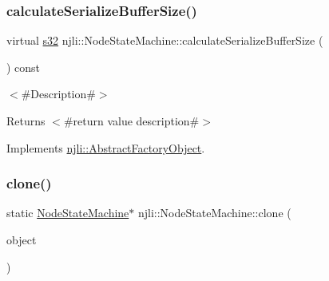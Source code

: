 \mbox{\label{classnjli_1_1_node_state_machine_a623987a0f43198b70aa9373d758a5afe}} 
\subsubsection{\texorpdfstring{calculate\+Serialize\+Buffer\+Size()}{calculateSerializeBufferSize()}}
{\footnotesize\ttfamily virtual \mbox{\hyperlink{_util_8h_aa62c75d314a0d1f37f79c4b73b2292e2}{s32}} njli\+::\+Node\+State\+Machine\+::calculate\+Serialize\+Buffer\+Size (\begin{DoxyParamCaption}{ }\end{DoxyParamCaption}) const\hspace{0.3cm}{\ttfamily [virtual]}}

$<$\#\+Description\#$>$

\begin{DoxyReturn}{Returns}
$<$\#return value description\#$>$ 
\end{DoxyReturn}


Implements \mbox{\hyperlink{classnjli_1_1_abstract_factory_object_a4763d05bc9dc37c559111f8bb30e1dd8}{njli\+::\+Abstract\+Factory\+Object}}.

\mbox{\label{classnjli_1_1_node_state_machine_a5fd34376d9ddab87af68c8e02b43e540}} 
\subsubsection{\texorpdfstring{clone()}{clone()}}
{\footnotesize\ttfamily static \mbox{\hyperlink{classnjli_1_1_node_state_machine}{Node\+State\+Machine}}$\ast$ njli\+::\+Node\+State\+Machine\+::clone (\begin{DoxyParamCaption}\item[{const \mbox{\hyperlink{classnjli_1_1_node_state_machine}{Node\+State\+Machine}} \&}]{object }\end{DoxyParamCaption})\hspace{0.3cm}{\ttfamily [static]}}

